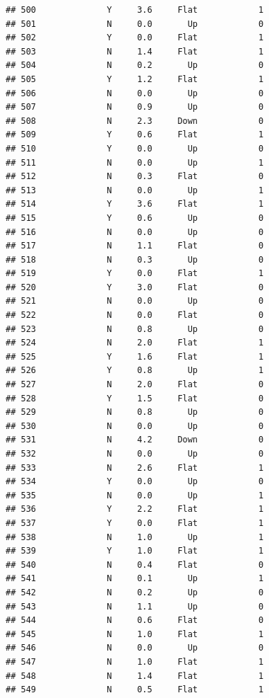 \documentclass[
]{article}
\begin{document}
\begin{verbatim}
## 500              Y     3.6     Flat            1
## 501              N     0.0       Up            0
## 502              Y     0.0     Flat            1
## 503              N     1.4     Flat            1
## 504              N     0.2       Up            0
## 505              Y     1.2     Flat            1
## 506              N     0.0       Up            0
## 507              N     0.9       Up            0
## 508              N     2.3     Down            0
## 509              Y     0.6     Flat            1
## 510              Y     0.0       Up            0
## 511              N     0.0       Up            1
## 512              N     0.3     Flat            0
## 513              N     0.0       Up            1
## 514              Y     3.6     Flat            1
## 515              Y     0.6       Up            0
## 516              N     0.0       Up            0
## 517              N     1.1     Flat            0
## 518              N     0.3       Up            0
## 519              Y     0.0     Flat            1
## 520              Y     3.0     Flat            0
## 521              N     0.0       Up            0
## 522              N     0.0     Flat            0
## 523              N     0.8       Up            0
## 524              N     2.0     Flat            1
## 525              Y     1.6     Flat            1
## 526              Y     0.8       Up            1
## 527              N     2.0     Flat            0
## 528              Y     1.5     Flat            0
## 529              N     0.8       Up            0
## 530              N     0.0       Up            0
## 531              N     4.2     Down            0
## 532              N     0.0       Up            0
## 533              N     2.6     Flat            1
## 534              Y     0.0       Up            0
## 535              N     0.0       Up            1
## 536              Y     2.2     Flat            1
## 537              Y     0.0     Flat            1
## 538              N     1.0       Up            1
## 539              Y     1.0     Flat            1
## 540              N     0.4     Flat            0
## 541              N     0.1       Up            1
## 542              N     0.2       Up            0
## 543              N     1.1       Up            0
## 544              N     0.6     Flat            0
## 545              N     1.0     Flat            1
## 546              N     0.0       Up            0
## 547              N     1.0     Flat            1
## 548              N     1.4     Flat            1
## 549              N     0.5     Flat            1

\end{verbatim}
\end{document}
